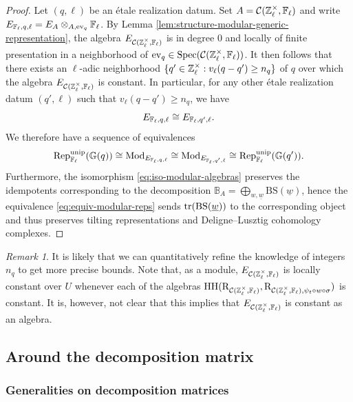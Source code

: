 \documentclass[a4paper, 10pt, oneside, reqno]{amsart}
\theoremstyle{plain}
\theoremstyle{definition}
\theoremstyle{remark}
\newtheorem{rque}[thm]{Remark}
\newcommand{\Gbb}{\mathbb{G}}
\newcommand{\RR}{\mathrm{R}}
\newcommand{\BS}{\mathrm{BS}}
\newcommand{\HHH}{\mathrm{HH}}
\begin{document}
\begin{proof}
Let $(q,\ell)$ be an étale realization datum. Set $A = \mathcal{C}(\mathbb{Z}_{\ell}^{\times}, \mathbb{F}_{\ell})$ and write $E_{\mathbb{F}_{\ell},q,\ell} = E_A \otimes_{A,\mathrm{ev}_q} \mathbb{F}_{\ell}$. By Lemma \ref{lem:structure-modular-generic-representation}, the algebra $E_{\mathcal{C}(\mathbb{Z}_{\ell}^{\times}, \mathbb{F}_{\ell})}$ is in degree $0$ and locally of finite presentation in a neighborhood of $\mathrm{ev}_q \in \mathrm{Spec}(\mathcal{C}(\mathbb{Z}_{\ell}^{\times}, \mathbb{F}_{\ell}))$. It then follows that there exists an $\ell$-adic neighborhood $\{q' \in \mathbb{Z}_{\ell}^{\times} : v_\ell(q-q') \geq n_q\}$ of $q$ over which the algebra $E_{\mathcal{C}(\mathbb{Z}_{\ell}^{\times}, \mathbb{F}_{\ell})}$ is constant. In particular, for any other étale realization datum $(q', \ell)$ such that $v_{\ell}(q-q') \geq n_q$, we have 
\begin{equation}\label{eq:iso-modular-algebras}
E_{\mathbb{F}_{\ell},q,\ell} \cong E_{\mathbb{F}_{\ell}, q', \ell}.
\end{equation}
We therefore have a sequence of equivalences 
\begin{equation}\label{eq:equiv-modular-reps}
\Rep_{\Fl}^{\unip}(\Gbb(q)) \cong \Mod_{E_{\Fl,q,\ell}} \cong \Mod_{E_{\Fl,q',\ell}} \cong \Rep_{\Fl}^{\unip}(\Gbb(q')).
\end{equation}
Furthermore, the isomorphism \eqref{eq:iso-modular-algebras} preserves the idempotents corresponding to the decomposition $\mathbb{B}_A = \bigoplus_{w, \underline{w}} \BS(\underline{w})$, hence the equivalence \eqref{eq:equiv-modular-reps} sends $\tr(\BS(\underline{w}))$ to the corresponding object and thus preserves tilting representations and Deligne--Lusztig cohomology complexes. 
\end{proof}

\begin{rque}
It is likely that we can quantitatively refine the knowledge of integers $n_q$ to get more precise bounds. Note that, as a module, $E_{\mathcal{C}(\mathbb{Z}_{\ell}^{\times}, \mathbb{F}_{\ell})}$ is locally constant over $U$ whenever each of the algebras $\HHH(\RR_{\Ccal(\Zl^{\times}, \Fl)}, \RR_{\Ccal(\Zl^{\times}, \Fl), \psi_t \circ w \circ \sigma})$ is constant. It is, however, not clear that this implies that $E_{\mathcal{C}(\mathbb{Z}_{\ell}^{\times}, \mathbb{F}_{\ell})}$ is constant as an algebra. 
\end{rque}


\subsection{Around the decomposition matrix}

\subsubsection{Generalities on decomposition matrices}
\end{document}
